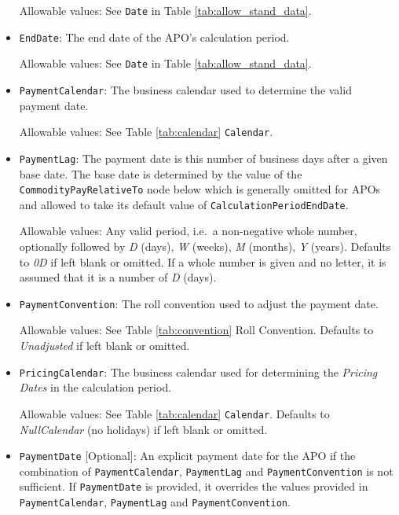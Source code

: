 \begin{itemize}
Allowable values:  See \lstinline!Date! in Table \ref{tab:allow_stand_data}.

\item \lstinline!EndDate!: The end date of the APO's calculation period.

Allowable values:  See \lstinline!Date! in Table \ref{tab:allow_stand_data}.

\item \lstinline!PaymentCalendar!: The business calendar used to determine the valid payment date.

Allowable values: See Table \ref{tab:calendar} \lstinline!Calendar!. 

\item \lstinline!PaymentLag!: The payment date is this number of business days after a given base date. The base date is determined by the value of the \lstinline!CommodityPayRelativeTo! node below which is generally omitted for APOs and allowed to take its default value of \lstinline!CalculationPeriodEndDate!.

Allowable values: Any valid period, i.e.\ a non-negative whole number, optionally followed by \emph{D} (days), \emph{W} (weeks), \emph{M} (months),
  \emph{Y} (years). Defaults to \emph{0D} if left blank or omitted. If a whole number is given and no letter, it is assumed that it is a number of  \emph{D} (days).


\item \lstinline!PaymentConvention!: The roll convention used to adjust the payment date.

Allowable values: See Table \ref{tab:convention} Roll Convention. Defaults to \emph{Unadjusted} if left blank or omitted.

\item \lstinline!PricingCalendar!: The business calendar used for determining the \textit{Pricing Dates} in the calculation period.

Allowable values: See Table \ref{tab:calendar} \lstinline!Calendar!. Defaults to \emph{NullCalendar} (no holidays) if left blank or omitted.

\item \lstinline!PaymentDate! [Optional]: An explicit payment date for the APO if the combination of \lstinline!PaymentCalendar!, \lstinline!PaymentLag! and \lstinline!PaymentConvention! is not sufficient. If \lstinline!PaymentDate! is provided, it overrides the values provided in \lstinline!PaymentCalendar!, \lstinline!PaymentLag! and \lstinline!PaymentConvention!.


\end{itemize}
